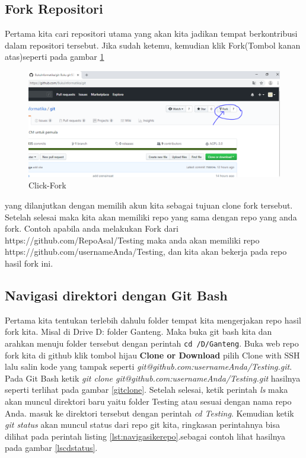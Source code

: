 \subsection{Fork Repositori}
Pertama kita cari repositori utama yang akan kita jadikan tempat berkontribusi dalam repositori tersebut. Jika sudah ketemu, kemudian klik Fork(Tombol kanan atas)seperti pada gambar \ref{fork}
  \begin{figure}[!htbp]
        \centering
            \includegraphics[width=.85\textwidth]{Figures/Click-Fork}
            \caption{Click-Fork}
        \label{fork}
    \end{figure}
yang dilanjutkan dengan memilih akun kita sebagai tujuan clone fork tersebut. Setelah selesai maka kita akan memiliki repo yang sama dengan repo yang anda fork. Contoh apabila anda melakukan Fork dari https://github.com/RepoAsal/Testing maka anda akan memiliki repo https://github.com/usernameAnda/Testing, dan kita akan bekerja pada repo hasil fork ini.


\subsection{Navigasi direktori dengan Git Bash}
Pertama kita tentukan terlebih dahulu folder tempat kita mengerjakan repo hasil fork kita. Misal di Drive D: folder Ganteng. Maka buka git bash kita dan arahkan menuju folder tersebut dengan perintah 
\verb|cd /D/Ganteng|.
Buka web repo fork kita di github klik tombol hijau \textbf{Clone or Download} pilih Clone with SSH lalu salin kode yang tampak seperti \textit{git@github.com:usernameAnda/Testing.git}. Pada Git Bash ketik \textit{git clone git@github.com:usernameAnda/Testing.git} hasilnya seperti terlihat pada gambar \ref{gitclone}. Setelah selesai, ketik perintah \textit{ls} maka akan muncul direktori baru yaitu folder Testing atau sesuai dengan nama repo Anda. masuk ke direktori tersebut dengan perintah \textit{cd Testing}. Kemudian ketik \textit{git status} akan muncul status dari repo git kita, ringkasan perintahnya bisa dilihat pada perintah listing \ref{lst:navigasikerepo}.sebagai contoh lihat hasilnya pada gambar \ref{lscdstatus}.

